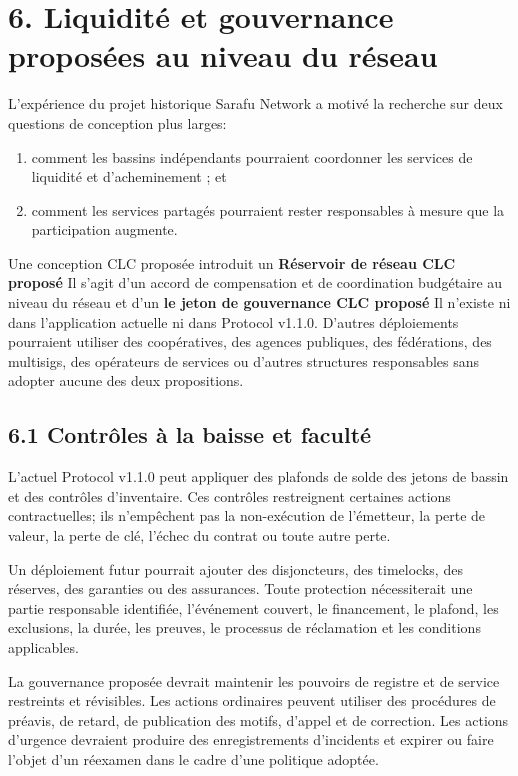 \documentclass[11pt]{article}
\begin{document}
\section*{6. Liquidité et gouvernance proposées au niveau du réseau}

L'expérience du projet historique Sarafu Network a motivé la recherche sur deux questions de conception plus larges:

\begin{enumerate}[leftmargin=*]
\item comment les bassins indépendants pourraient coordonner les services de liquidité et d'acheminement ; et
\item comment les services partagés pourraient rester responsables à mesure que la participation augmente.
\end{enumerate}
Une conception CLC proposée introduit un \textbf{Réservoir de réseau CLC proposé } Il s'agit d'un accord de compensation et de coordination budgétaire au niveau du réseau et d'un \textbf{ le jeton de gouvernance CLC proposé} Il n'existe ni dans l'application actuelle ni dans Protocol v1.1.0. D'autres déploiements pourraient utiliser des coopératives, des agences publiques, des fédérations, des multisigs, des opérateurs de services ou d'autres structures responsables sans adopter aucune des deux propositions.

\subsection*{6.1 Contrôles à la baisse et faculté}

L'actuel Protocol v1.1.0 peut appliquer des plafonds de solde des jetons de bassin et des contrôles d'inventaire. Ces contrôles restreignent certaines actions contractuelles; ils n'empêchent pas la non-exécution de l'émetteur, la perte de valeur, la perte de clé, l'échec du contrat ou toute autre perte.

Un déploiement futur pourrait ajouter des disjoncteurs, des timelocks, des réserves, des garanties ou des assurances. Toute protection nécessiterait une partie responsable identifiée, l'événement couvert, le financement, le plafond, les exclusions, la durée, les preuves, le processus de réclamation et les conditions applicables.

La gouvernance proposée devrait maintenir les pouvoirs de registre et de service restreints et révisibles. Les actions ordinaires peuvent utiliser des procédures de préavis, de retard, de publication des motifs, d'appel et de correction. Les actions d'urgence devraient produire des enregistrements d'incidents et expirer ou faire l'objet d'un réexamen dans le cadre d'une politique adoptée.
\end{document}
